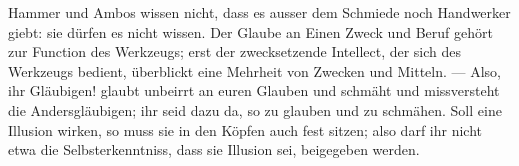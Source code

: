 Hammer und Ambos wissen nicht, dass es ausser dem Schmiede noch Handwerker giebt: sie dürfen es nicht wissen. Der Glaube an Einen Zweck und Beruf gehört zur Function des Werkzeugs; erst der zwecksetzende Intellect, der sich des Werkzeugs bedient, überblickt eine Mehrheit von Zwecken und Mitteln. — Also, ihr Gläubigen! glaubt unbeirrt an euren Glauben und schmäht und missversteht die Andersgläubigen; ihr seid dazu da, so zu glauben und zu schmähen. Soll eine Illusion wirken, so muss sie in den Köpfen auch fest sitzen; also darf ihr nicht etwa die Selbsterkenntniss, dass sie Illusion sei, beigegeben werden.
\par

